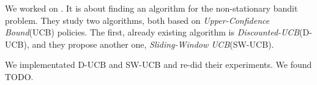We worked on \cite{garivier2008upperconfidence}. It is about finding an algorithm for the non-stationary bandit problem. They study two algorithms, both based on \textit{Upper-Confidence Bound}(UCB) policies. The first, already existing algorithm is \textit{Discounted-UCB}(D-UCB), and they propose another one, \textit{Sliding-Window UCB}(SW-UCB).

We implementated D-UCB and SW-UCB and re-did their experiments. We found TODO.